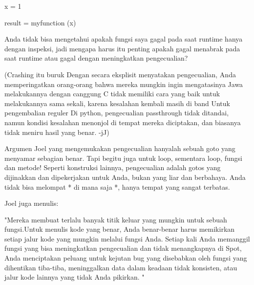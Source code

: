 \vspace{12pt}
x = 1 \par
result = myfunction (x) \par
\vspace{12pt}
Anda tidak bisa mengetahui apakah fungsi saya gagal pada saat runtime hanya dengan inspeksi, jadi mengapa harus itu penting apakah gagal menabrak pada saat runtime atau gagal dengan meningkatkan pengecualian? \par
\vspace{12pt}
(Crashing itu buruk Dengan secara eksplisit menyatakan pengecualian, Anda memperingatkan orang-orang bahwa mereka mungkin ingin mengatasinya Jawa melakukannya dengan canggung C tidak memiliki cara yang baik untuk melakukannya sama sekali, karena kesalahan kembali masih di band Untuk pengembalian reguler Di python, pengecualian passthrough tidak ditandai, namun kondisi kesalahan menonjol di tempat mereka diciptakan, dan biasanya tidak meniru hasil yang benar. -jJ) \par
\vspace{12pt}
Argumen Joel yang mengemukakan pengecualian hanyalah sebuah goto yang menyamar sebagian benar. Tapi begitu juga untuk loop, sementara loop, fungsi dan metode! Seperti konstruksi lainnya, pengecualian adalah gotos yang dijinakkan dan dipekerjakan untuk Anda, bukan yang liar dan berbahaya. Anda tidak bisa melompat * di mana saja *, hanya tempat yang sangat terbatas. \par
\vspace{12pt}
Joel juga menulis: \par
\vspace{12pt}
"Mereka membuat terlalu banyak titik keluar yang mungkin untuk sebuah fungsi.Untuk menulis kode yang benar, Anda benar-benar harus memikirkan setiap jalur kode yang mungkin melalui fungsi Anda. Setiap kali Anda memanggil fungsi yang bisa meningkatkan pengecualian dan tidak menangkapnya di Spot, Anda menciptakan peluang untuk kejutan bug yang disebabkan oleh fungsi yang dihentikan tiba-tiba, meninggalkan data dalam keadaan tidak konsisten, atau jalur kode lainnya yang tidak Anda pikirkan. " \par
\vspace{12pt}
\vspace{12pt}
\vspace{12pt}
